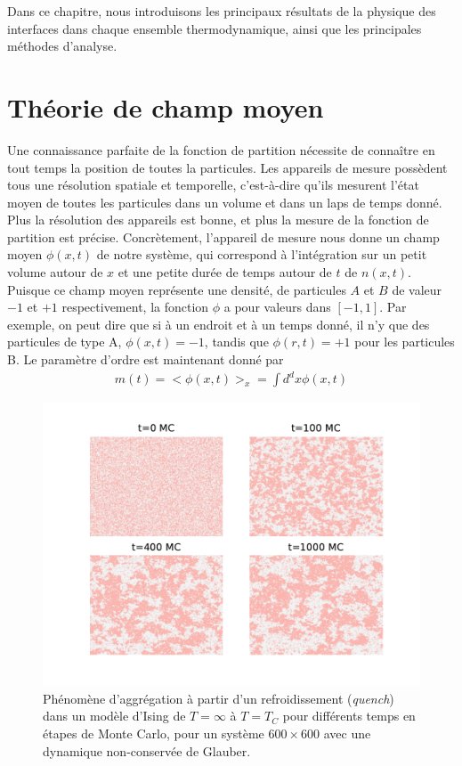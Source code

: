 Dans ce chapitre, nous introduisons les principaux résultats de la physique des interfaces dans chaque ensemble thermodynamique, ainsi que les principales méthodes d'analyse. 

    \section{Théorie de champ moyen}

Une connaissance parfaite de la fonction de partition nécessite de connaître en tout temps la position de toutes la particules. Les appareils de mesure possèdent tous une résolution spatiale et temporelle, c'est-à-dire qu'ils mesurent l'état moyen de toutes les particules dans un volume et dans un laps de temps donné. Plus la résolution des appareils est bonne, et plus la mesure de la fonction de partition est précise. 
Concrètement, l'appareil de mesure nous donne un champ moyen $\phi(x,t)$ de notre système, qui correspond à l'intégration sur un petit volume autour de $x$ et une petite durée de temps autour de $t$ de $n(x,t)$. 
Puisque ce champ moyen représente une densité, de particules $A$ et $B$ de valeur $-1$ et $+1$ respectivement, la fonction $\phi$ a pour valeurs dans $[-1,1]$.
Par exemple, on peut dire que si à un endroit et à un temps donné, il n'y que des particules de type A, $\phi(x,t)=-1$, tandis que $\phi(r,t)=+1$ pour les particules B. Le paramètre d'ordre est maintenant donné par
\begin{align}
    m(t) = <\phi(x,t)>_x = \int d^dx  \phi(x,t)
\end{align}

\begin{figure}[h]
    \centering
    \includegraphics[width=0.9\linewidth]{intro/clusterization.pdf}
    \caption{Phénomène d'aggrégation à partir d'un refroidissement (\textit{quench}) dans un modèle d'Ising de $T=\infty$ à $T=T_C$ pour différents temps en étapes de Monte Carlo, pour un système $600 \times 600$ avec une dynamique non-conservée de Glauber.}
    \label{clusterization}
\end{figure}

